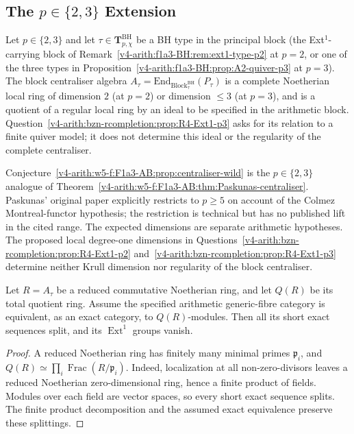 \subsection{The \(p\in\{2,3\}\) Extension}

\begin{conjecture}
\label{v4-arith:w5-f:F1a3-AB:prop:centraliser-wild}
Let \(p\in\{2,3\}\) and let
\(\tau\in\mathbf{T}^{\mathrm{BH}}_{p,\chi}\) be a BH type in the
principal block (the Ext\({}^{1}\)-carrying block of
Remark~\ref{v4-arith:f1a3-BH:rem:ext1-type-p2} at \(p=2\), or one of the
three types in Proposition~\ref{v4-arith:f1a3-BH:prop:A2-quiver-p3} at
\(p=3\)). The block centraliser algebra
\(A_{\tau}=\mathrm{End}_{\mathrm{Block}^{\mathrm{BH}}_{\tau}}(P_{\tau})\)
is a complete Noetherian local ring of dimension \(2\) (at \(p=2\)) or
dimension \(\leq 3\) (at \(p=3\)), and is a quotient of a regular
local ring by an ideal to be specified in the arithmetic block.
Question~\ref{v4-arith:bzn-rcompletion:prop:R4-Ext1-p3} asks for
its relation to a finite quiver model; it does not determine this
ideal or the regularity of the complete centraliser.
\end{conjecture}

\begin{remark}
\label{v4-arith:w5-f:F1a3-AB:rem:centraliser-wild-conditional}
Conjecture~\ref{v4-arith:w5-f:F1a3-AB:prop:centraliser-wild} is the
\(p\in\{2,3\}\) analogue of
Theorem~\ref{v4-arith:w5-f:F1a3-AB:thm:Paskunas-centraliser}. Paskunas'
original paper explicitly restricts to \(p\geq 5\) on account of the
Colmez Montreal-functor hypothesis; the restriction is technical
but has no published lift in the cited range. The expected dimensions are separate arithmetic hypotheses.
The proposed local degree-one dimensions in
Questions~\ref{v4-arith:bzn-rcompletion:prop:R4-Ext1-p2}
and~\ref{v4-arith:bzn-rcompletion:prop:R4-Ext1-p3} determine neither
Krull dimension nor regularity of the block centraliser.
\end{remark}

\begin{corollary}
\label{v4-arith:w5-f:F1a3-AB:cor:Ext1-wild-conditional}
Let \(R=A_\tau\) be a reduced commutative Noetherian ring, and let
\(Q(R)\) be its total quotient ring. Assume the specified arithmetic
generic-fibre category is equivalent, as an exact category, to
\(Q(R)\)-modules. Then all its short exact sequences split, and
its \(\operatorname{Ext}^1\) groups vanish.
\end{corollary}
\begin{proof}
A reduced Noetherian ring has finitely many minimal primes
\(\mathfrak p_i\), and
\(Q(R)\simeq\prod_i\operatorname{Frac}(R/\mathfrak p_i)\).
Indeed, localization at all non-zero-divisors leaves a reduced
Noetherian zero-dimensional ring, hence a finite product of fields.
Modules over each field are vector spaces, so every short exact
sequence splits. The finite product decomposition and the assumed
exact equivalence preserve these splittings.
\end{proof}

